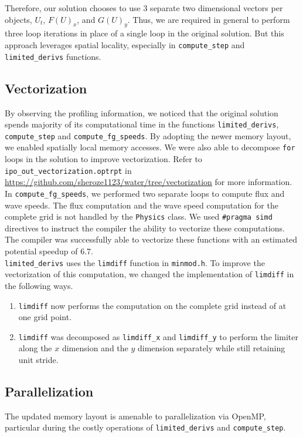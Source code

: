 \documentclass[11pt]{article}
\begin{document}
Therefore, our solution chooses to use 3 separate two dimensional vectors per objects, $U_t$, $F(U)_x$, and $G(U)_y$. Thus, we are required in general to perform three loop iterations in place of a single loop in the original solution. But this approach leverages spatial locality, especially in \texttt{compute\_step} and \texttt{limited\_derivs} functions.

\subsection{Vectorization}

By observing the profiling information, we noticed that the original solution spends majority of its computational time in the functions \texttt{limited\_derivs}, \texttt{compute\_step} and \texttt{compute\_fg\_speeds}. By adopting the newer memory layout, we enabled spatially local memory accesses. We were also able to decompose \texttt{for} loops in the solution to improve vectorization. Refer to \texttt{ipo\_out\_vectorization.optrpt} in \url{https://github.com/sheroze1123/water/tree/vectorization} for more information. \\

In \texttt{compute\_fg\_speeds}, we performed two separate loops to compute flux and wave speeds. The flux computation and the wave speed computation for the complete grid is not handled by the \texttt{Physics} class. We used \texttt{\#pragma simd} directives to instruct the compiler the ability to vectorize these computations. The compiler was successfully able to vectorize these functions with an estimated potential speedup of 6.7. \\

\texttt{limited\_derivs} uses the \texttt{limdiff} function in \texttt{minmod.h}. To improve the vectorization of this computation, we changed the implementation of \texttt{limdiff} in the following ways. 

\begin{enumerate}
	\item \texttt{limdiff} now performs the computation on the complete grid instead of at one grid point.
	\item \texttt{limdiff} was decomposed as \texttt{limdiff\_x} and \texttt{limdiff\_y} to perform the limiter along the $x$ dimension and the $y$ dimension separately while still retaining unit stride. 
\end{enumerate}

\subsection{Parallelization}
The updated memory layout is amenable to parallelization via OpenMP, particular during the costly operations of \texttt{limited\_derivs} and \texttt{compute\_step}. \\
\end{document}
